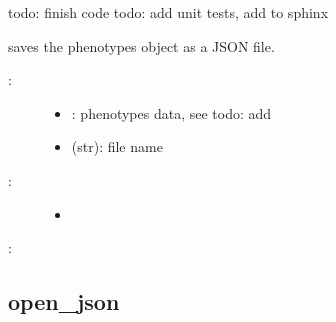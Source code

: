 \documentclass[letterpaper,10pt,english]{sphinxmanual}
\begin{document}
\begin{fulllineitems}
\label{\detokenize{Phenotypes:PyBoolNet.Phenotypes.save_json}}
todo: finish code
todo: add unit tests, add to sphinx

saves the phenotypes object as a JSON file.
\begin{description}
\item[{:}] \leavevmode\begin{itemize}
\item {} 
: phenotypes data, see todo: add 

\item {} 
 (str): file name

\end{itemize}

\item[{:}] \leavevmode\begin{itemize}
\item {} 

\end{itemize}

\end{description}

:

\begin{sphinxVerbatim}[commandchars=\\\{\}]
 
 
\end{sphinxVerbatim}

\end{fulllineitems}



\subsection{open\_json}
\label{\detokenize{Phenotypes:phenotypes-open-json}}\label{\detokenize{Phenotypes:open-json}}
\end{document}
